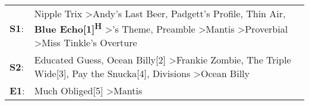 \begin{supertabular}{p{0.03\textwidth}p{0.92\textwidth}}
 \textbf{S1}:  &  Nipple Trix\textsuperscript{} \textgreater \enspace Andy's Last Beer\textsuperscript{}, \enspace Padgett's Profile\textsuperscript{}, \enspace Thin Air\textsuperscript{}, \enspace \textbf{Blue Echo[1]\textsuperscript{H}} \textgreater {}'s Theme\textsuperscript{}, \enspace Preamble\textsuperscript{} \textgreater \enspace Mantis\textsuperscript{} \textgreater \enspace Proverbial\textsuperscript{} \textgreater \enspace Miss Tinkle's Overture\textsuperscript{}  \enspace  \\
 \textbf{S2}:  &                                                                                                                                                              Educated Guess\textsuperscript{}, \enspace Ocean Billy[2]\textsuperscript{} \textgreater \enspace Frankie Zombie\textsuperscript{}, \enspace The Triple Wide[3]\textsuperscript{}, \enspace Pay the Snucka[4]\textsuperscript{}, \enspace Divisions\textsuperscript{} \textgreater \enspace Ocean Billy\textsuperscript{}  \enspace  \\
 \textbf{E1}:  &                                                                                                                                                                                                                                                                                                                                                                                                       Much Obliged[5]\textsuperscript{} \textgreater \enspace Mantis\textsuperscript{}  \enspace  \\
\end{supertabular}
